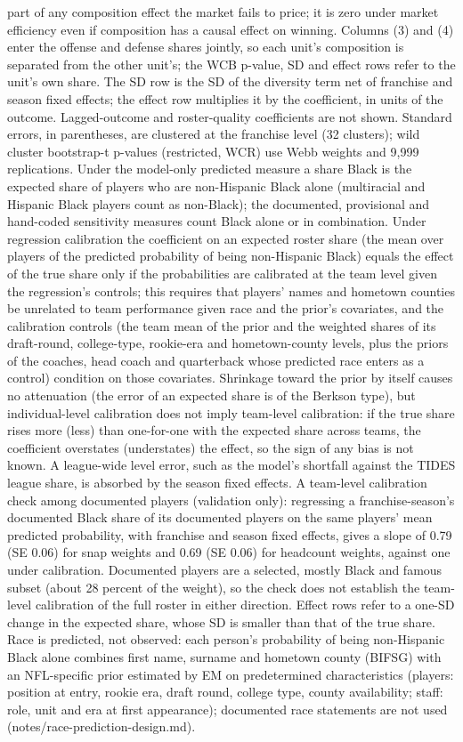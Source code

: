 {part of any composition effect the market fails to price; it is zero under market efficiency even if composition has a causal effect on winning. Columns (3) and (4) enter the offense and defense shares jointly, so each unit's composition is separated from the other unit's; the WCB p-value, SD and effect rows refer to the unit's own share. The SD row is the SD of the diversity term net of franchise and season fixed effects; the effect row multiplies it by the coefficient, in units of the outcome. Lagged-outcome and roster-quality coefficients are not shown. Standard errors, in parentheses, are clustered at the franchise level (32 clusters); wild cluster bootstrap-t p-values (restricted, WCR) use Webb weights and 9,999 replications. Under the model-only predicted measure a share Black is the expected share of players who are non-Hispanic Black alone (multiracial and Hispanic Black players count as non-Black); the documented, provisional and hand-coded sensitivity measures count Black alone or in combination. Under regression calibration the coefficient on an expected roster share (the mean over players of the predicted probability of being non-Hispanic Black) equals the effect of the true share only if the probabilities are calibrated at the team level given the regression's controls; this requires that players' names and hometown counties be unrelated to team performance given race and the prior's covariates, and the calibration controls (the team mean of the prior and the weighted shares of its draft-round, college-type, rookie-era and hometown-county levels, plus the priors of the coaches, head coach and quarterback whose predicted race enters as a control) condition on those covariates. Shrinkage toward the prior by itself causes no attenuation (the error of an expected share is of the Berkson type), but individual-level calibration does not imply team-level calibration: if the true share rises more (less) than one-for-one with the expected share across teams, the coefficient overstates (understates) the effect, so the sign of any bias is not known. A league-wide level error, such as the model's shortfall against the TIDES league share, is absorbed by the season fixed effects. A team-level calibration check among documented players (validation only): regressing a franchise-season's documented Black share of its documented players on the same players' mean predicted probability, with franchise and season fixed effects, gives a slope of 0.79 (SE 0.06) for snap weights and  0.69 (SE 0.06) for headcount weights, against one under calibration. Documented players are a selected, mostly Black and famous subset (about 28 percent of the weight), so the check does not establish the team-level calibration of the full roster in either direction. Effect rows refer to a one-SD change in the expected share, whose SD is smaller than that of the true share. Race is predicted, not observed: each person's probability of being non-Hispanic Black alone combines first name, surname and hometown county (BIFSG) with an NFL-specific prior estimated by EM on predetermined characteristics (players: position at entry, rookie era, draft round, college type, county availability; staff: role, unit and era at first appearance); documented race statements are not used (notes/race-prediction-design.md). }
